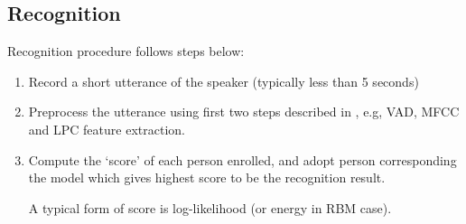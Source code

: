 \subsection{Recognition}
	Recognition procedure follows steps below:
	\begin{enumerate}
		\item Record a short utterance of the speaker (typically less than 5 seconds)

		\item Preprocess the utterance using first two steps described in
			, e.g, VAD, MFCC and LPC feature extraction.

		\item Compute the `score' of each person enrolled, and adopt person
			corresponding the model which gives highest score to be the
			recognition result.

			A typical form of score is log-likelihood (or energy in RBM case).
	\end{enumerate}
